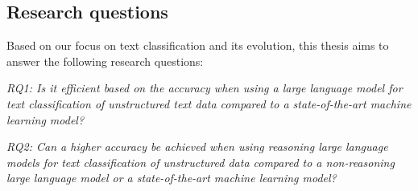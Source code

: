 \subsection{Research questions}

Based on our focus on text classification and its evolution, this thesis aims to answer the following research questions:

\bigskip
\textit{RQ1: Is it efficient based on the accuracy when using a large language model for text classification of unstructured text data compared to a state-of-the-art machine learning model?}

\bigskip
\textit{RQ2: Can a higher accuracy be achieved when using reasoning large language models for text classification of unstructured data compared to a non-reasoning large language model or a state-of-the-art machine learning model?}
